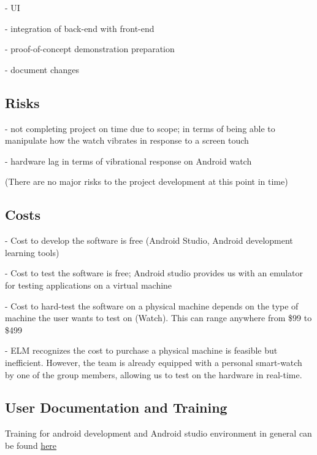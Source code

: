 \documentclass[12pt, titlepage]{article}
\begin{document}
- UI

- integration of back-end with front-end

\noindent - proof-of-concept demonstration preparation

\noindent - document changes

\subsection{Risks}

- not completing project on time due to scope; in terms of being able to manipulate how the watch vibrates in response to a screen touch

\noindent - hardware lag in terms of vibrational response on Android watch

\noindent (There are no major risks to the project development at this point in time)

\subsection{Costs}

- Cost to develop the software is free (Android Studio, Android development learning tools)

\noindent - Cost to test the software is free; Android studio provides us with an emulator for testing applications on a virtual machine

\noindent - Cost to hard-test the software on a physical machine depends on the type of machine the user wants to test on (Watch). This can range anywhere from \$99 to \$499

\noindent - ELM recognizes the cost to purchase a physical machine is feasible but inefficient. However, the team is already equipped with a personal smart-watch by one of the group members, allowing us to test on the hardware in real-time.

\subsection{User Documentation and Training}

Training for android development and Android studio environment in general can be found \href{https://developer.android.com/index.html}{here} %




\end{document}
